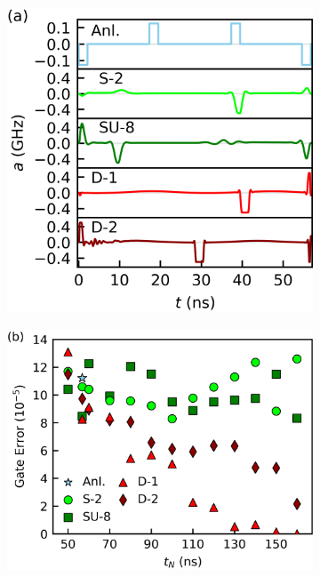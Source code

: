 \documentclass[
  amsfonts,
  amsmath,
  tbtags,
  amssymb,
  aps,
  nobibnotes,
  twocolumn,
  superscriptaddress,
]{revtex4-2}
\begin{document}
\begin{figure}[ht]
  \begin{subfigure}{.315\textwidth}
    \includegraphics[width=\linewidth]{assets/f2a.png}
  \end{subfigure}\hfill
  \begin{subfigure}{.4\textwidth}
    \includegraphics[width=\linewidth]{assets/f2c.png}
  \end{subfigure}\hfill

\end{figure}
\end{document}
